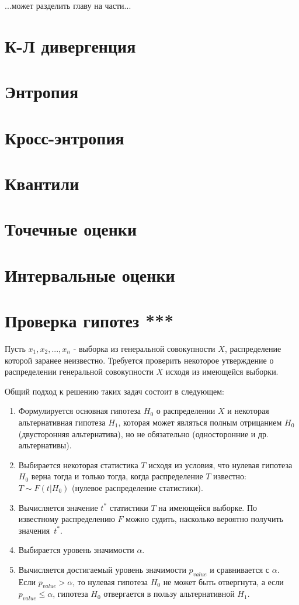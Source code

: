 ...может разделить главу на части...


\section{К-Л дивергенция}


\section{Энтропия}


\section{Кросс-энтропия}


\section{Квантили}


\section{Точечные оценки}


\section{Интервальные оценки}


\section{Проверка гипотез ***}

Пусть $x_1, x_2, ..., x_n$ - выборка из генеральной совокупности $X$, распределение которой заранее неизвестно.
Требуется проверить некоторое утверждение о распределении генеральной совокупности $X$ исходя из имеющейся выборки.

Общий подход к решению таких задач состоит в следующем:
\begin{enumerate}
    \item Формулируется основная гипотеза $H_0$ о распределении $X$ и некоторая альтернативная гипотеза $H_1$, которая может являться полным отрицанием $H_0$ (двусторонняя альтернатива), но не обязательно (односторонние и др. альтернативы).
    \item Выбирается некоторая статистика $T$ исходя из условия, что нулевая гипотеза $H_0$ верна тогда и только тогда, когда распределение $T$ известно: $T \sim F(t|H_0)$ (нулевое распределение статистики). 
    \item Вычисляется значение $t^*$ статистики $T$ на имеющейся выборке. По известному распределению $F$ можно судить, насколько вероятно получить значения~$t^*$.
    \item Выбирается уровень значимости $\alpha$.
    \item Вычисляется достигаемый уровень значимости $p_{value}$ и сравнивается с $\alpha$. Если $p_{value} > \alpha$, то нулевая гипотеза $H_0$ не может быть отвергнута, а если $p_{value} \leqslant \alpha$, гипотеза $H_0$ отвергается в пользу альтернативной $H_1$.
\end{enumerate}

